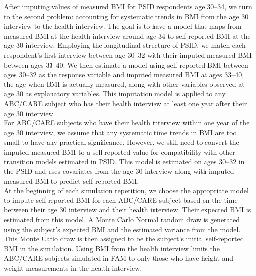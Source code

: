 \noindent After imputing values of measured BMI for PSID respondents age 30--34, we turn to the second problem: accounting for systematic trends in BMI from the age 30 interview to the health interview. The goal is to have a model that maps from measured BMI at the health interview around age 34 to self-reported BMI at the age 30 interview. Employing the longitudinal structure of PSID, we match each respondent's first interview between age 30--32 with their imputed measured BMI between ages 33--40. We then estimate a model using self-reported BMI between ages 30--32 as the response variable and imputed measured BMI at ages 33--40, the age when BMI is actually measured, along with other variables observed at age 30 as explanatory variables. This imputation model is applied to any ABC/CARE subject who has their health interview at least one year after their age 30 interview.\\

\noindent For ABC/CARE subjects who have their health interview within one year of the age 30 interview, we assume that any systematic time trends in BMI are too small to have any practical significance. However, we still need to convert the imputed measured BMI to a self-reported value for compatibility with other transition models estimated in PSID. This model is estimated on ages 30--32 in the PSID and uses covariates from the age 30 interview along with imputed measured BMI to predict self-reported BMI. \\

\noindent At the beginning of each simulation repetition, we choose the appropriate model to impute self-reported BMI for each ABC/CARE subject based on the time between their age 30 interview and their health interview. Their expected BMI is estimated from this model. A Monte Carlo Normal random draw is generated using the subject's expected BMI and the estimated variance from the model. This Monte Carlo draw is then assigned to be the subject's initial self-reported BMI in the simulation. Using BMI from the health interview limits the ABC/CARE subjects simulated in FAM to only those who have height and weight measurements in the health interview. \\

